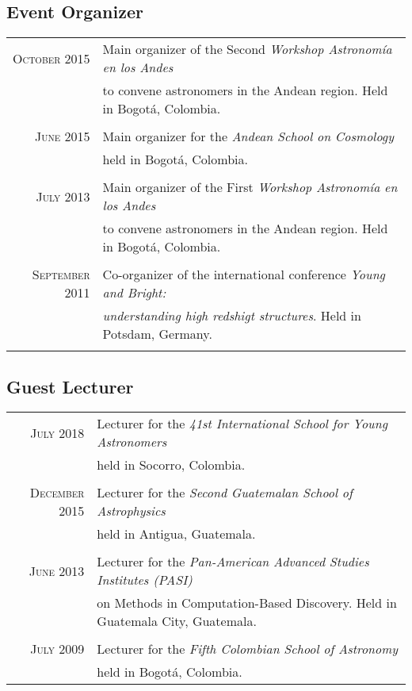 \documentclass[a4paper,10pt]{article} %
\begin{document}
\subsection{Event Organizer}
\begin{tabular}{rl}
 \textsc{October 2015} &  Main organizer of the Second
 \textit{Workshop Astronom\'ia en los Andes} \\
   & to convene astronomers in the Andean region.  Held in Bogot\'a, Colombia.\\
& \\
 \textsc{June 2015} &  Main organizer for the 
 \textit{Andean School on Cosmology} \\
   & held in Bogot\'a, Colombia.\\
& \\
 \textsc{July 2013} &  Main organizer of the First
 \textit{Workshop Astronom\'ia en los Andes} \\
   & to convene astronomers in the Andean region.  Held in Bogot\'a, Colombia.\\
& \\
 \textsc{September 2011} &  Co-organizer of the international
 conference \textit{Young and Bright:}\\
 & \textit{understanding high redshigt structures}. Held in
 Potsdam, Germany.\\ 
& \\

\end{tabular}


\subsection{Guest Lecturer}
\begin{tabular}{rl}
 \textsc{July 2018} &  Lecturer for the
 \textit{41st International School for Young Astronomers} \\
   & held in Socorro, Colombia.\\
& \\
 \textsc{December 2015} &  Lecturer for the 
 \textit{Second Guatemalan School of Astrophysics} \\
   & held in Antigua, Guatemala.\\
& \\
 \textsc{June 2013} &  Lecturer for the 
 \textit{Pan-American Advanced Studies Institutes (PASI)} \\
   &  on Methods in Computation-Based Discovery.  Held in Guatemala City, Guatemala.\\
& \\
\textsc{July 2009} & Lecturer for the 
\textit{Fifth Colombian School of Astronomy}\\
& held in Bogot\'a, Colombia.\\

\end{tabular}
\end{document}

